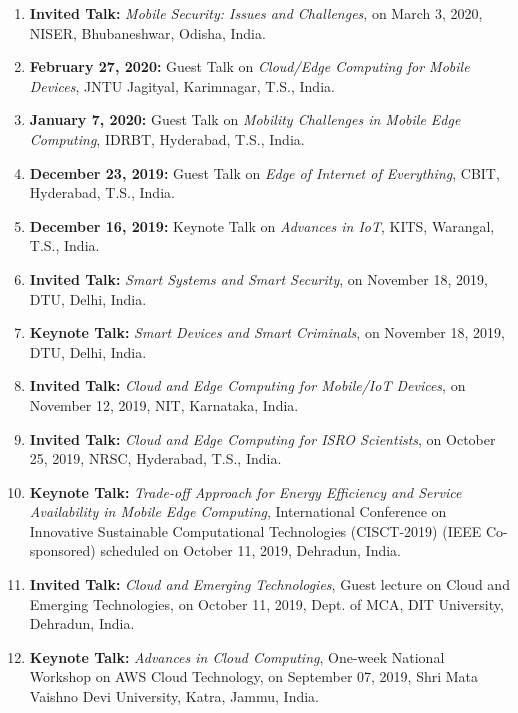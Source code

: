 \begin{enumerate}
\item
\textbf{Invited Talk:} \textit{Mobile Security: Issues and Challenges}, on March 3, 2020, NISER, Bhubaneshwar, Odisha, India.

\item
\textbf{February 27, 2020:} Guest Talk on \textit{Cloud/Edge Computing for Mobile Devices}, JNTU Jagityal, Karimnagar, T.S., India.

\item
\textbf{January 7, 2020:} Guest Talk on \textit{Mobility Challenges in Mobile Edge Computing}, IDRBT, Hyderabad, T.S., India.

\item
\textbf{December 23, 2019:} Guest Talk on \textit{Edge of Internet of Everything}, CBIT, Hyderabad, T.S., India.

\item
\textbf{December 16, 2019:} Keynote Talk on \textit{Advances in IoT}, KITS, Warangal, T.S., India.

\item
\textbf{Invited Talk:} \textit{Smart Systems and Smart Security}, on November 18, 2019, DTU, Delhi, India.

\item
\textbf{Keynote Talk:} \textit{Smart Devices and Smart Criminals}, on November 18, 2019, DTU, Delhi, India.

\item
\textbf{Invited Talk:} \textit{Cloud and Edge Computing for Mobile/IoT Devices}, on November 12, 2019, NIT, Karnataka, India.

\item
\textbf{Invited Talk:} \textit{Cloud and Edge Computing for ISRO Scientists}, on October 25, 2019, NRSC, Hyderabad, T.S., India.

\item
\textbf{Keynote Talk:} \textit{Trade-off Approach for Energy Efficiency and Service Availability in Mobile Edge Computing}, International Conference on Innovative Sustainable Computational Technologies (CISCT-2019) (IEEE Co-sponsored) scheduled on October 11, 2019, Dehradun, India.

\item
\textbf{Invited Talk:} \textit{Cloud and Emerging Technologies}, Guest lecture on Cloud and Emerging Technologies, on October 11, 2019, Dept. of MCA, DIT University, Dehradun, India.

\item
\textbf{Keynote Talk:} \textit{Advances in Cloud Computing}, One-week National Workshop on AWS Cloud Technology, on September 07, 2019, Shri Mata Vaishno Devi University, Katra, Jammu, India.


\end{enumerate}
